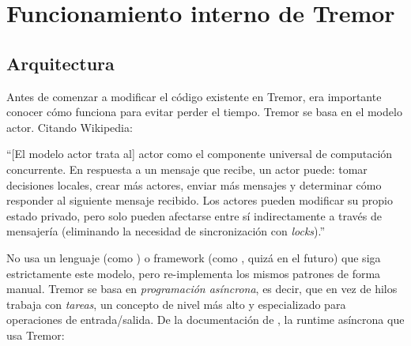 
\chapter{Funcionamiento interno de Tremor}\label{annex:tremor}

\section{Arquitectura}

Antes de comenzar a modificar el código existente en Tremor, era importante
conocer cómo funciona para evitar perder el tiempo. Tremor se basa en el modelo
actor. Citando Wikipedia:


``[El modelo actor trata al] actor como el componente universal de computación
concurrente. En respuesta a un mensaje que recibe, un actor puede: tomar
decisiones locales, crear más actores, enviar más mensajes y determinar cómo
responder al siguiente mensaje recibido. Los actores pueden modificar su propio
estado privado, pero solo pueden afectarse entre sí indirectamente a través de
mensajería (eliminando la necesidad de sincronización con
\emph{locks}).''~\cite{wikiactor}

No usa un lenguaje (como ) o framework (como
, quizá en el futuro) que siga estrictamente este modelo, pero
re-implementa los mismos patrones de forma manual. Tremor se basa en
\emph{programación asíncrona}, es decir, que en vez de hilos trabaja con
\emph{tareas}, un concepto de nivel más alto y especializado para operaciones de
entrada/salida. De la documentación de , la runtime
asíncrona que usa Tremor:


